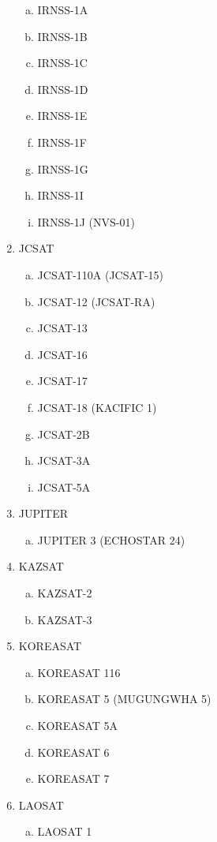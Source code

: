 \begin{multicols}{2}
\begin{enumerate}
  \begin{enumerate}[a.]
    \item IRNSS-1A
    \item IRNSS-1B
    \item IRNSS-1C
    \item IRNSS-1D
    \item IRNSS-1E
    \item IRNSS-1F
    \item IRNSS-1G
    \item IRNSS-1I
    \item IRNSS-1J (NVS-01)
  \end{enumerate}
  \item JCSAT
  \begin{enumerate}[a.]
    \item JCSAT-110A (JCSAT-15)
    \item JCSAT-12 (JCSAT-RA)
    \item JCSAT-13
    \item JCSAT-16
    \item JCSAT-17
    \item JCSAT-18 (KACIFIC 1)
    \item JCSAT-2B
    \item JCSAT-3A
    \item JCSAT-5A
  \end{enumerate}
  \item JUPITER
  \begin{enumerate}[a.]
    \item JUPITER 3 (ECHOSTAR 24)
  \end{enumerate}
  \item KAZSAT
  \begin{enumerate}[a.]
    \item KAZSAT-2
    \item KAZSAT-3
  \end{enumerate}
  \item KOREASAT
  \begin{enumerate}[a.]
    \item KOREASAT 116
    \item KOREASAT 5 (MUGUNGWHA 5)
    \item KOREASAT 5A
    \item KOREASAT 6
    \item KOREASAT 7
  \end{enumerate}
  \item LAOSAT
  \begin{enumerate}[a.]
    \item LAOSAT 1

\end{enumerate}
\end{enumerate}
\end{multicols}

